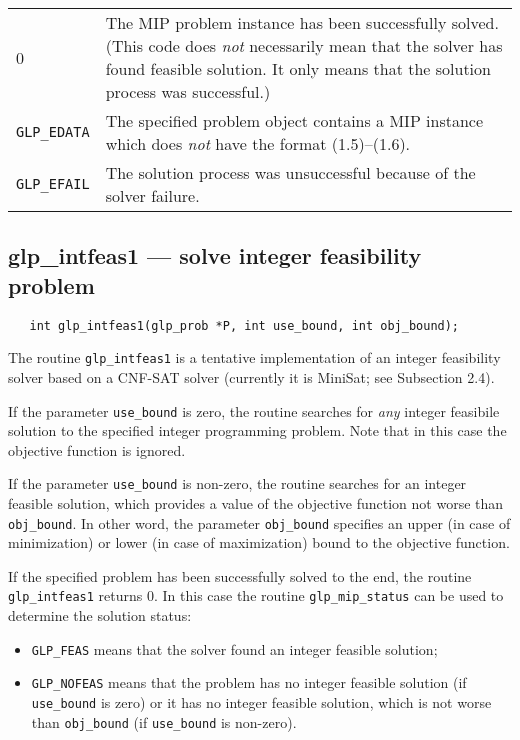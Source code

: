\documentclass[11pt,draft]{article}
\makeatletter
\def\para#1{\noindent{\bf#1}}
\def\synopsis{\para{Synopsis}}
\def\description{\para{Description}}
\def\returns{\para{Returns}}
\newenvironment{retlist}
{  \def\arraystretch{1.5}
   \noindent
   \begin{tabular}{@{}p{1in}@{}p{5.5in}@{}}
}
{\end{tabular}}
\makeatother
\begin{document}
\returns

\begin{retlist}
0 & The MIP problem instance has been successfully solved. (This code
does {\it not} necessarily mean that the solver has found feasible
solution. It only means that the solution process was successful.)\\

{\tt GLP\_EDATA} & The specified problem object contains a MIP
instance which does {\it not} have the format (1.5)--(1.6).\\

{\tt GLP\_EFAIL} & The solution process was unsuccessful because of
the solver failure.\\
\end{retlist}

\subsection{glp\_intfeas1 --- solve integer feasibility problem}

\synopsis

\begin{verbatim}
   int glp_intfeas1(glp_prob *P, int use_bound, int obj_bound);
\end{verbatim}

\description

The routine \verb|glp_intfeas1| is a tentative implementation of
an integer feasibility solver based on a CNF-SAT solver (currently
it is MiniSat; see Subsection 2.4).

If the parameter \verb|use_bound| is zero, the routine searches for
{\it any} integer feasibile solution to the specified integer
programming problem. Note that in this case the objective function is
ignored.

If the parameter \verb|use_bound| is non-zero, the routine searches for
an integer feasible solution, which provides a value of the objective
function not worse than \verb|obj_bound|. In other word, the parameter
\verb|obj_bound| specifies an upper (in case of minimization) or lower
(in case of maximization) bound to the objective function.

If the specified problem has been successfully solved to the end, the
routine \verb|glp_intfeas1| returns 0. In this case the routine
\verb|glp_mip_status| can be used to determine the solution status:

\begin{itemize}
\item {\tt GLP\_FEAS} means that the solver found an integer feasible
solution;

\item {\tt GLP\_NOFEAS} means that the problem has no integer feasible
solution (if {\tt use\_bound} is zero) or it has no integer feasible
solution, which is not worse than {\tt obj\_bound} (if {\tt use\_bound}
is non-zero).
\end{itemize}
\end{document}
